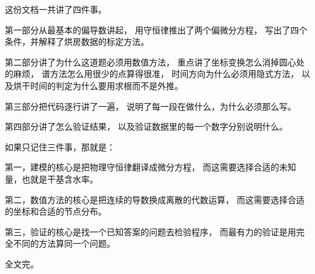 这份文档一共讲了四件事。

第一部分从最基本的偏导数讲起，
用守恒律推出了两个偏微分方程，
写出了四个条件，并解释了烘房数据的标定方法。

第二部分讲了为什么这道题必须用数值方法，
重点讲了坐标变换怎么消掉圆心处的麻烦，
谱方法怎么用很少的点算得很准，
时间方向为什么必须用隐式方法，
以及烘干时间的判定为什么要用求根而不是外推。

第三部分把代码逐行讲了一遍，
说明了每一段在做什么，为什么必须那么写。

第四部分讲了怎么验证结果，
以及验证数据里的每一个数字分别说明什么。

如果只记住三件事，那就是：

第一，建模的核心是把物理守恒律翻译成微分方程，
而这需要选择合适的未知量，也就是干基含水率。

第二，数值方法的核心是把连续的导数换成离散的代数运算，
而这需要选择合适的坐标和合适的节点分布。

第三，验证的核心是找一个已知答案的问题去检验程序，
而最有力的验证是用完全不同的方法算同一个问题。

\vspace{1em}
\noindent
全文完。
